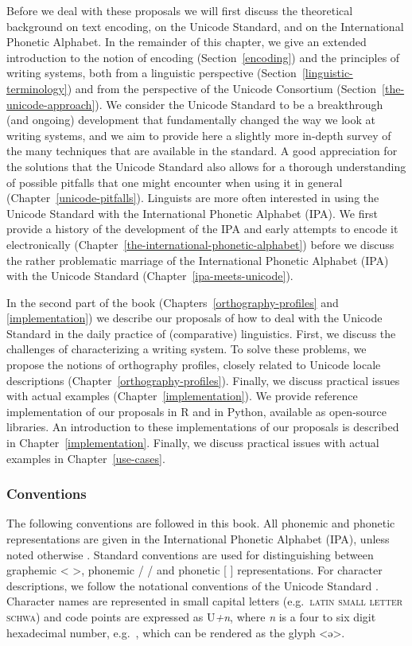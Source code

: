 Before we deal with these proposals we will first discuss the theoretical
background on text encoding, on the Unicode Standard, and on the International
Phonetic Alphabet. In the remainder of this chapter, we give an extended
introduction to the notion of encoding (Section~\ref{encoding}) and the
principles of writing systems, both from a linguistic perspective
(Section~\ref{linguistic-terminology}) and from the perspective of the Unicode
Consortium (Section~\ref{the-unicode-approach}). We consider the Unicode
Standard to be a breakthrough (and ongoing) development that fundamentally
changed the way we look at writing systems, and we aim to provide here a
slightly more in-depth survey of the many techniques that are available in the
standard. A good appreciation for the solutions that the Unicode Standard also
allows for a thorough understanding of possible pitfalls that one might
encounter when using it in general (Chapter~\ref{unicode-pitfalls}). Linguists are more often interested in using the Unicode Standard with the International Phonetic Alphabet (IPA). We first provide a history of the development of the IPA and early attempts to encode it electronically (Chapter~\ref{the-international-phonetic-alphabet}) before we discuss the rather problematic marriage of the International Phonetic Alphabet (IPA) with the Unicode Standard (Chapter~\ref{ipa-meets-unicode}).

In the second part of the book (Chapters~\ref{orthography-profiles} and
\ref{implementation}) we describe our proposals of how to deal with the Unicode
Standard in the daily practice of (comparative) linguistics. First, we discuss the
challenges of characterizing a writing system. To solve these problems, we
propose the notions of orthography profiles, closely related to Unicode locale
descriptions (Chapter~\ref{orthography-profiles}). Finally, we discuss practical
issues with actual examples (Chapter~\ref{implementation}). We provide reference
implementation of our proposals in R and in Python, available as open-source
libraries. An introduction to these implementations of our proposals is
described in Chapter~\ref{implementation}. Finally, we discuss practical issues
with actual examples in Chapter~\ref{use-cases}. 

\subsubsection*{Conventions}

The following conventions are followed in this book. All phonemic and phonetic
representations are given in the International Phonetic Alphabet (IPA), unless
noted otherwise \citep{IPA2005}. Standard conventions are used for
distinguishing between graphemic < >, phonemic / / and phonetic [ ]
representations. For character descriptions, we follow the notational
conventions of the Unicode Standard \citep{Unicode2014}. Character names are
represented in small capital letters (e.g.~\textsc{latin small letter schwa})
and code points are expressed as U\emph{+n}, where \emph{n} is a four to six
digit hexadecimal number, e.g.~, which can be rendered as the glyph <ə>.

